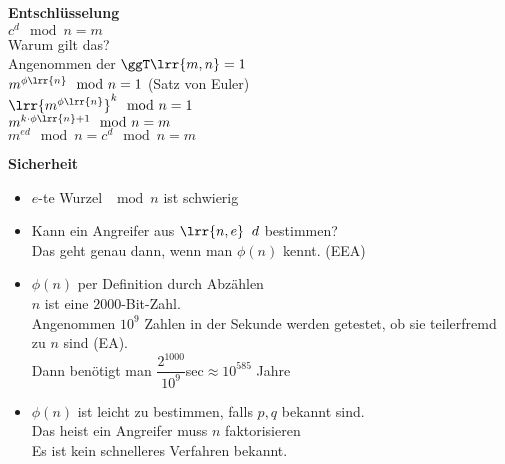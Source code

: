 	\textbf{Entschlüsselung}\\
	$c^d\mod n = m$\\
	Warum gilt das?\\
	Angenommen der $\ggT\lrr{m,n}=1$\\
	$m^{\phi\lrr{n}}\mod n=1$ (Satz von Euler)\\
	$\lrr{m^{\phi\lrr{n}}}^k\mod n = 1$\\
	$m^{k\cdot\phi\lrr{n}+1}\mod n = m$\\
	$m^{ed}\mod n = c^d\mod n=m$

	\textbf{Sicherheit}
	\begin{itemize}
		\item $e$-te Wurzel $\mod n$ ist schwierig
		\item Kann ein Angreifer aus $\lrr{n,e}\;\;d$ bestimmen?\\
			Das geht genau dann, wenn man $\phi(n)$ kennt. (EEA)
		\item $\phi(n)$ per Definition durch Abzählen\\
			$n$ ist eine $2000$-Bit-Zahl.\\
			Angenommen $10^9$ Zahlen in der Sekunde werden getestet, ob sie teilerfremd zu $n$ sind (EA).\\
			Dann benötigt man $\dfrac{2^1000}{10^9}$sec$\approx 10^{585}$ Jahre
		\item $\phi(n)$ ist leicht zu bestimmen, falls $p,q$ bekannt sind.\\
			Das heist ein Angreifer muss $n$ faktorisieren\\
			Es ist kein schnelleres Verfahren bekannt.
	\end{itemize}
